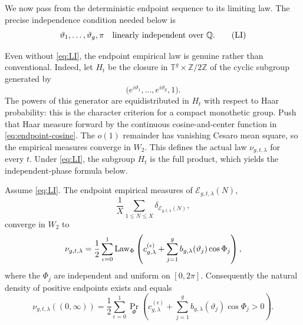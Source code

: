 We now pass from the deterministic endpoint sequence to its limiting law.
The precise independence condition needed below is
\begin{equation*}
 \vartheta_1,\ldots,\vartheta_g,\pi
 \quad\hbox{linearly independent over }\mathbb Q.
 \tag{LI}\label{eq:LI}
\end{equation*}

Even without \eqref{eq:LI}, the endpoint empirical law is genuine rather than
conventional.  Indeed, let \(H_t\) be the closure in
\(\mathbb T^g\times\mathbb Z/2\mathbb Z\) of the cyclic subgroup generated by
\[
 \bigl(e^{i\vartheta_1},\ldots,e^{i\vartheta_g},1\bigr).
\]
The powers of this generator are equidistributed in \(H_t\) with respect to
Haar probability: this is the character criterion for a compact monothetic
group.  Push that Haar measure forward by the continuous cosine-and-center
function in \eqref{eq:endpoint-cosine}.  The \(o(1)\) remainder has vanishing
Cesaro mean square, so the empirical measures converge in \(W_2\).  This
defines the actual law \(\nu_{g,t,\lambda}\) for every \(t\).  Under
\eqref{eq:LI}, the subgroup \(H_t\) is the full product, which yields the
independent-phase formula below.

\begin{proposition}
\label{prop:exact-quenched-law}
Assume \eqref{eq:LI}.  The endpoint empirical measures of
\(\mathcal E_{g,t,\lambda}(N)\),
\[
 \frac1X\sum_{1\leq N\leq X}
   \delta_{\mathcal E_{g,t,\lambda}(N)},
\]
converge in \(W_2\) to
\begin{equation}
 \nu_{g,t,\lambda}
 =\frac12\sum_{\epsilon=0}^1
 \operatorname{Law}_{\Phi}\left(
   c_{g,\lambda}^{(\epsilon)}+
   \sum_{j=1}^g b_{g,\lambda}(\vartheta_j)\cos\Phi_j
 \right),
\label{eq:finite-quenched-law}
\end{equation}
where the \(\Phi_j\) are independent and uniform on \([0,2\pi]\).
Consequently the natural density of positive endpoints exists and equals
\begin{equation}
 \nu_{g,t,\lambda}((0,\infty))
 =\frac12\sum_{\epsilon=0}^1
 \Pr_{\Phi}\left(
   c_{g,\lambda}^{(\epsilon)}+
   \sum_{j=1}^g b_{g,\lambda}(\vartheta_j)\cos\Phi_j>0
 \right).
\label{eq:finite-density-functional}
\end{equation}
\end{proposition}

